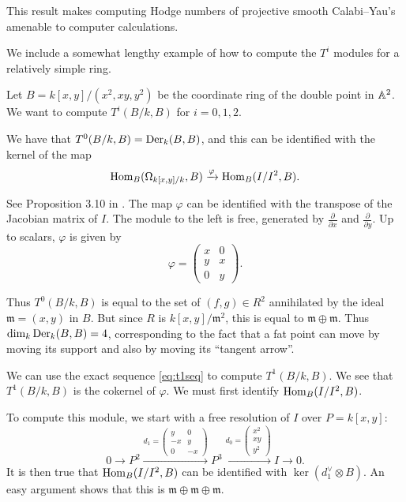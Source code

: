 This result makes computing Hodge numbers of projective smooth Calabi--Yau's amenable to computer calculations.

We include a somewhat lengthy example of how to compute the $T^i$ modules for a relatively simple ring.

\begin{example}
Let $B=k[x,y]/(x^2,xy,y^2)$ be the coordinate ring of the double point in $\mathbb{A}^2$. We want to compute $T^i(B/k,B)$ for $i=0,1,2$. 

We have that $T^0(B/k,B) = \operatorname{Der}_k(B,B)$, and this can be identified with the kernel of the map
$$
\operatorname{Hom}_B(\Omega_{k[x,y]/k},B) \xrightarrow{\varphi} \operatorname{Hom}_B(I/I^2,B).
$$

See Proposition 3.10 in \cite{hartshorne_deformations}. The map $\varphi$ can be identified with the transpose of the Jacobian matrix of $I$. The module to the left is free, generated by $\frac{\partial}{\partial x}$ and $\frac{\partial}{\partial y}$. Up to scalars, $\varphi$ is given by 
\[
\varphi = \begin{pmatrix}
x & 0 \\ y & x \\ 0 & y
\end{pmatrix}.
\]

Thus $T^0(B/k,B)$ is equal to the set of $(f,g) \in R^2$ annihilated by the ideal $\mathfrak m = (x,y)$ in $B$. But since $R$ is $k[x,y]/\mathfrak m^2$, this is equal to $\mathfrak m \oplus \mathfrak m$. Thus $\dim_k \operatorname{Der}_k(B,B) = 4$, corresponding to the fact that a fat point can move by moving its support and also by moving its ``tangent arrow''.

We can use the exact sequence \eqref{eq:t1seq} to compute $T^1(B/k,B)$. We see that $T^1(B/k,B)$ is the cokernel of $\varphi$. We must first identify $\operatorname{Hom}_B(I/I^2,B)$.

To compute this module, we start with a free resolution of $I$ over $P=k[x,y]$:
\[
0 \to 
P^2 \xrightarrow{d_1 = 
	\begin{pmatrix}
	y & 0 \\ -x & y \\ 0  & -x
	\end{pmatrix}
} P^3 \xrightarrow{ d_0 = 
	\begin{pmatrix}
	x^2 \\ xy \\ y^2
	\end{pmatrix}
} I \to 0.
\]
It is then true that $\operatorname{Hom}_B(I/I^2,B)$ can be identified with $\ker ( d_1^\vee \otimes B)$. An easy argument shows that this is $\mathfrak m \oplus \mathfrak m  \oplus \mathfrak m$.


\end{example}
